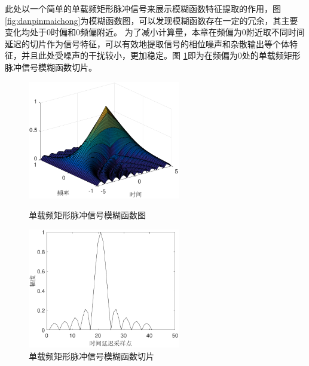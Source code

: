 此处以一个简单的单载频矩形脉冲信号来展示模糊函数特征提取的作用，图\ref{fig:danpinmaichong}为模糊函数图，可以发现模糊函数存在一定的冗余，其主要变化均处于0时偏和0频偏附近。
为了减小计算量，本章在频偏为0附近取不同时间延迟的切片作为信号特征，可以有效地提取信号的相位噪声和杂散输出等个体特征，并且此处受噪声的干扰较小，更加稳定。图 \ref{fig:qiepian}即为在频偏为0处的单载频矩形脉冲信号模糊函数切片。

\begin{figure}[hbt]
	\centering
	\begin{minipage}[b][][b]{7cm}
		\centering
		\includegraphics[width=6.67cm]{figures/emitter/danpinmaichong}
		\caption{单载频矩形脉冲信号模糊函数图}
		\label{fig:danpinmaichong}
	\end{minipage}
	\hspace{10pt}
	\begin{minipage}[b][][b]{7cm}
		\centering
		\includegraphics[width=6.67cm]{figures/emitter/qiepian}
		\caption{单载频矩形脉冲信号模糊函数切片}
		\label{fig:qiepian}
	\end{minipage}

\end{figure}

